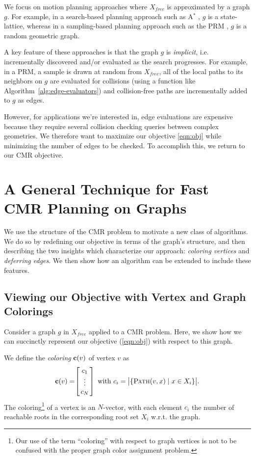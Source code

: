 We focus on motion planning approaches where
$X_{free}$ is approximated by a graph $g$.
For example,
in a search-based planning approach such as A$^*$ \cite{hart1968astar},
$g$ is a state-lattice,
whereas in a sampling-based planning approach such as the
PRM \cite{kavrakietal1996prm},
$g$ is a random geometric graph.

A key feature of these approaches is that the graph $g$ is \emph{implicit},
i.e. incrementally discovered and/or evaluated as the search progresses.
For example, in a PRM, a sample is drawn at random from $X_{free}$,
all of the local paths to its neighbors on $g$
are evaluated for collisions (using a function
like Algorithm~\ref{alg:edge-evaluators})
and collision-free paths are incrementally added to $g$ as edges.

However, for applications we're interested in,
edge evaluations are expensive \cite{lavalle2006planningbook}
because they require several collision checking queries between
complex geometries.
We therefore want to maximize our objective \eqref{eqn:obj}
while minimizing the number of edges to be checked.
To accomplish this, we return to our CMR objective.

\section{A General Technique for Fast CMR Planning on Graphs}
\label{sec:gen-sol}

We use the structure of the CMR problem
to motivate a new class of algorithms.
We do so by redefining our objective in terms of the graph's structure,
and then describing the two insights which characterize our approach:
\emph{coloring vertices} and \emph{deferring edges}.
We then show how an algorithm can be extended to include these features.

\subsection{Viewing our Objective with Vertex and Graph Colorings}

Consider a graph $g$ in $X_{free}$
applied to a CMR problem.
Here, we show how we can succinctly represent our objective
(\ref{eqn:obj}) with respect to this graph.

We define the \emph{coloring} ${\bf c}(v)$ of vertex $v$ as
\begin{equation}
   \arraycolsep=1.4pt
   {\bf c}(v) = \hspace{-0.03in} \left[\begin{array}{c}
   c_1 \\ \vdots \\ c_N \\
   \end{array}\right]
   \mbox{ with }
   c_i = \big| \{
      \textsc{Path}(v,x) \;|\; x \in X_i
      \} \big|.
\end{equation}
The coloring\footnote{
Our use of the term ``coloring'' with respect to graph vertices
is not to be confused with the proper graph color assignment problem.}
of a vertex is an $N$-vector,
with each element $c_i$ the number of reachable roots
in the corresponding root set $X_i$ w.r.t. the graph.

